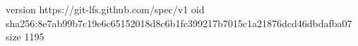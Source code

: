 version https://git-lfs.github.com/spec/v1
oid sha256:8e7ab99b7c19e6c65152018d8c6b1fc399217b7015c1a21876dcd46dbdafba07
size 1195
